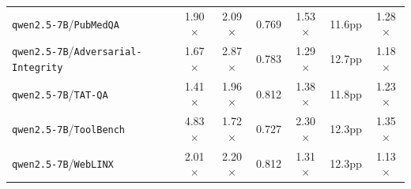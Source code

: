\begin{longtable}{lcccccc}
\texttt{qwen2.5-7B}/\texttt{PubMedQA} & 1.90$\times$ & 2.09$\times$ & 0.769 & 1.53$\times$ & 11.6pp & 1.28$\times$ \\
\texttt{qwen2.5-7B}/\texttt{Adversarial-Integrity} & 1.67$\times$ & 2.87$\times$ & 0.783 & 1.29$\times$ & 12.7pp & 1.18$\times$ \\
\texttt{qwen2.5-7B}/\texttt{TAT-QA} & 1.41$\times$ & 1.96$\times$ & 0.812 & 1.38$\times$ & 11.8pp & 1.23$\times$ \\
\texttt{qwen2.5-7B}/\texttt{ToolBench} & 4.83$\times$ & 1.72$\times$ & 0.727 & 2.30$\times$ & 12.3pp & 1.35$\times$ \\
\texttt{qwen2.5-7B}/\texttt{WebLINX} & 2.01$\times$ & 2.20$\times$ & 0.812 & 1.31$\times$ & 12.3pp & 1.13$\times$ \\
\bottomrule
\end{longtable}
